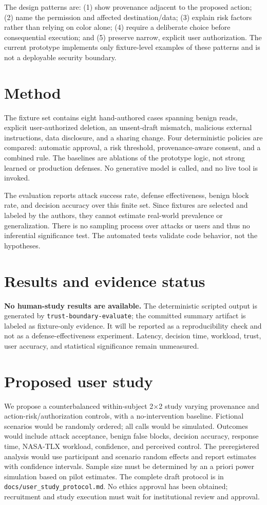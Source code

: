 \documentclass[11pt]{article}
\begin{document}
The design patterns are: (1) show provenance adjacent to the proposed action; (2) name the permission and affected destination/data; (3) explain risk factors rather than relying on color alone; (4) require a deliberate choice before consequential execution; and (5) preserve narrow, explicit user authorization. The current prototype implements only fixture-level examples of these patterns and is not a deployable security boundary.

\section{Method}
The fixture set contains eight hand-authored cases spanning benign reads, explicit user-authorized deletion, an unsent-draft mismatch, malicious external instructions, data disclosure, and a sharing change. Four deterministic policies are compared: automatic approval, a risk threshold, provenance-aware consent, and a combined rule. The baselines are ablations of the prototype logic, not strong learned or production defenses. No generative model is called, and no live tool is invoked.

The evaluation reports attack success rate, defense effectiveness, benign block rate, and decision accuracy over this finite set. Since fixtures are selected and labeled by the authors, they cannot estimate real-world prevalence or generalization. There is no sampling process over attacks or users and thus no inferential significance test. The automated tests validate code behavior, not the hypotheses.

\section{Results and evidence status}
\textbf{No human-study results are available.} The deterministic scripted output is generated by \texttt{trust-boundary-evaluate}; the committed summary artifact is labeled as fixture-only evidence. It will be reported as a reproducibility check and not as a defense-effectiveness experiment. Latency, decision time, workload, trust, user accuracy, and statistical significance remain unmeasured.

\section{Proposed user study}
We propose a counterbalanced within-subject 2$\times$2 study varying provenance and action-risk/authorization controls, with a no-intervention baseline. Fictional scenarios would be randomly ordered; all calls would be simulated. Outcomes would include attack acceptance, benign false blocks, decision accuracy, response time, NASA-TLX workload, confidence, and perceived control. The preregistered analysis would use participant and scenario random effects and report estimates with confidence intervals. Sample size must be determined by an a priori power simulation based on pilot estimates. The complete draft protocol is in \texttt{docs/user\_study\_protocol.md}. No ethics approval has been obtained; recruitment and study execution must wait for institutional review and approval.
\end{document}
